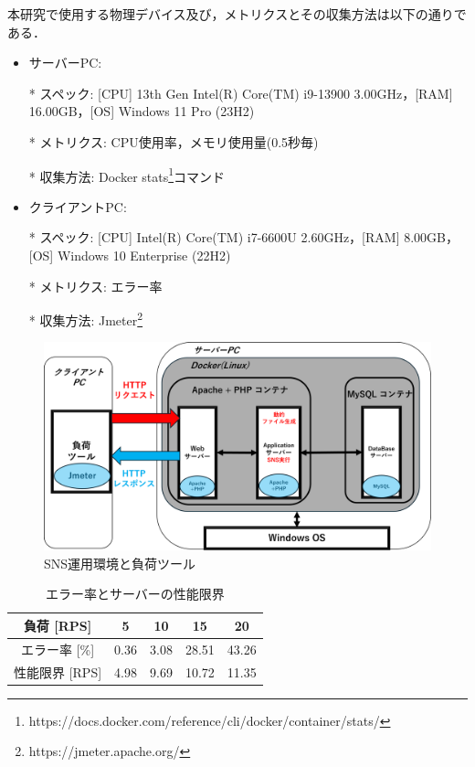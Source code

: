 \documentclass[twoside,twocolumn,10pt]{jarticle}  %
\begin{document}
本研究で使用する物理デバイス及び，メトリクスとその収集方法は以下の通りである．
\begin{itemize}
  \setlength{\parskip}{0cm} %
  \setlength{\itemsep}{0cm} %
  \item サーバーPC:
  \item[*] スペック: [CPU] 13th Gen Intel(R) Core(TM) i9-13900 3.00GHz，[RAM] 16.00GB，[OS] Windows 11 Pro (23H2)\par
  \item[*] メトリクス: CPU使用率，メモリ使用量(0.5秒毎)\par
  \item[*] 収集方法: Docker stats\footnote{https://docs.docker.com/reference/cli/docker/container/stats/}コマンド
  \item クライアントPC:
  \item[*] スペック: [CPU] Intel(R) Core(TM) i7-6600U 2.60GHz，[RAM] 8.00GB，[OS] Windows 10 Enterprise (22H2)\par
  \item[*] メトリクス: エラー率\par
  \item[*] 収集方法: Jmeter\footnote{https://jmeter.apache.org/}
\end{itemize}

\begin{figure}[t]
  \centering
  \includegraphics[scale=0.24]{figures/SNS_Docker.png}
  \vspace{-0.55cm}
  \caption{SNS運用環境と負荷ツール}
  \label{fig:1}
  \vspace{-0.15cm}
\end{figure}

\begin{table}[t]
  \vspace{-0.3cm}
  \centering
  \caption{エラー率とサーバーの性能限界}
  \label{tab:rps}
  \begin{tabular}{ccccc}
    \hline \hline
    負荷 [RPS] & 5 & 10 & 15 & 20 \\ \hline %
    エラー率 [\%] & 0.36 & 3.08 & 28.51 & 43.26 \\ \hline
    性能限界 [RPS] & 4.98 & 9.69 & 10.72 & 11.35 \\ \hline
  \end{tabular}
  \vspace{-0.4cm}
\end{table}
\end{document}

